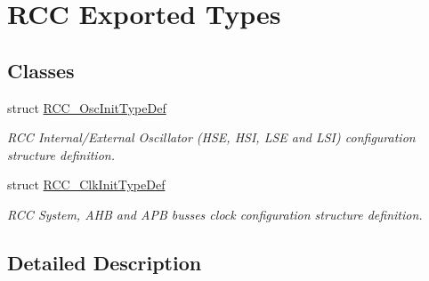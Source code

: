 \hypertarget{group___r_c_c___exported___types}{}\section{R\+CC Exported Types}
\label{group___r_c_c___exported___types}
\subsection*{Classes}
\begin{DoxyCompactItemize}
\item 
struct \hyperlink{struct_r_c_c___osc_init_type_def}{R\+C\+C\+\_\+\+Osc\+Init\+Type\+Def}
\begin{DoxyCompactList}\small\item\em R\+CC Internal/\+External Oscillator (H\+SE, H\+SI, L\+SE and L\+SI) configuration structure definition. \end{DoxyCompactList}\item 
struct \hyperlink{struct_r_c_c___clk_init_type_def}{R\+C\+C\+\_\+\+Clk\+Init\+Type\+Def}
\begin{DoxyCompactList}\small\item\em R\+CC System, A\+HB and A\+PB busses clock configuration structure definition. \end{DoxyCompactList}\end{DoxyCompactItemize}


\subsection{Detailed Description}
